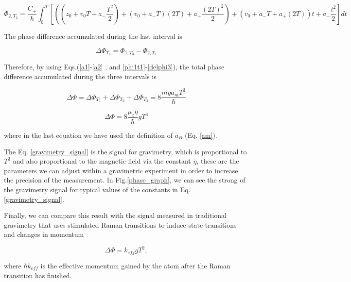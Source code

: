\documentclass{article}
\begin{document}
\begin{equation}
\Phi_{2, T_{3}} = \frac{C_{+}}{\hbar} \int_{0}^{T} [((z_{0}+v_{0}T+a_{-} \frac{T^{2}}{2}) + (v_{0}+a_{-}T)(2T) + a_{+} \frac{(2T)^{2}}{2}) + (v_{0}+a_{-}T + a_{+}(2T))t + a_{-} \frac{t^{2}}{2}]dt
\end{equation}

The phase difference accumulated during the last interval is

\begin{equation}\label{delphi3}
\Delta \Phi_{T_{3}} = \Phi_{1, T_{3}} - \Phi_{2, T_{3}}
\end{equation}

Therefore, by using Eqs.(\ref{a1}-\ref{a2} , and \ref{phi1t1}-\ref{delphi3}), the total phase difference accumulated during the three intervals is

\begin{equation}
\Delta \Phi = \Delta \Phi_{T_{1}} + \Delta \Phi_{T_{2}} + \Delta \Phi_{T_{3}} = 8 \frac{mga_{m}T^3}{\hbar}
\end{equation}

\begin{equation}\label{gravimetry_signal}
\Delta \Phi = 8 \frac{\mu_{z} \eta}{\hbar} g T^3
\end{equation}

where in the last equation we have used the definition of $a_B$ (Eq. \ref{am}). 

The Eq. \ref{gravimetry_signal} is the signal for gravimetry, which is proportional to $T^3$ and also proportional to the magnetic field via the constant $\eta$, these are the parameters we can adjust within a gravimetric experiment in order to increase the precision of the measurement. In Fig.\ref{phase_graph}, we can see the strong of the gravimetry signal for typical values of the constants in Eq. \ref{gravimetry_signal}. 

Finally, we can compare this result with the signal measured in traditional gravimetry that uses stimulated Raman transitions to induce state transitions and changes in momentum \cite{Peters_2001}

\begin{equation}\label{traditional_gravimetry_signal}
\Delta \Phi = k_{eff} g T^2 ,
\end{equation}

where $\hbar k_{eff}$ is the effective momentum gained by the atom after the Raman transition has finished.
\end{document}
